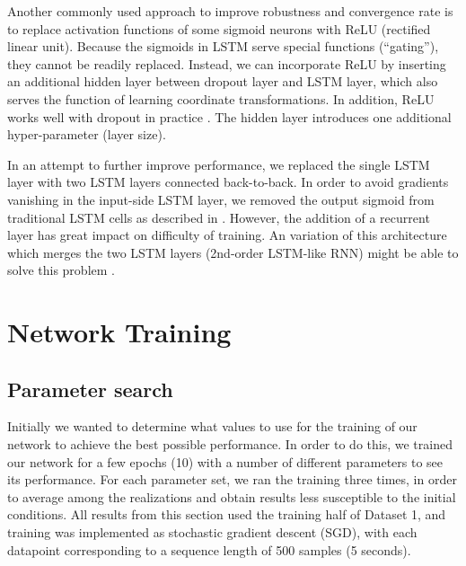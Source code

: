 \documentclass{acm_proc_article-sp}
\begin{document}
Another commonly used approach to improve robustness and convergence rate is to replace activation functions of some sigmoid neurons with ReLU (rectified linear unit). Because the sigmoids in LSTM serve special functions (``gating''), they cannot be readily replaced. Instead, we can incorporate ReLU by inserting an additional hidden layer between dropout layer and LSTM layer, which also serves the function of learning coordinate transformations. In addition, ReLU works well with dropout in practice \cite{Pham2013,Dahl2013}. The hidden layer introduces one additional hyper-parameter (layer size).

In an attempt to further improve performance, we replaced the single LSTM layer with two LSTM layers connected back-to-back. In order to avoid gradients vanishing in the input-side LSTM layer, we removed the output sigmoid from traditional LSTM cells as described in \cite{Gers2002}. However, the addition of a recurrent layer has great impact on difficulty of training. An variation of this architecture which merges the two LSTM layers (2nd-order LSTM-like RNN) might be able to solve this problem \cite{Monner2012}.

\section{Network Training}
\label{sec:Network Training}

\subsection{Parameter search}
Initially we wanted to determine what values to use for the training of our network to achieve the best possible performance. In order to do this, we trained our network for a few epochs (10) with a  number of different parameters to see its performance.
For each parameter set, we ran the training three times, in order to average among the realizations and obtain results less susceptible to the initial conditions.
All results from this section used the training half of Dataset 1, and training was implemented as stochastic gradient descent (SGD), with each datapoint corresponding to a sequence length of 500 samples (5 seconds).
\end{document}
